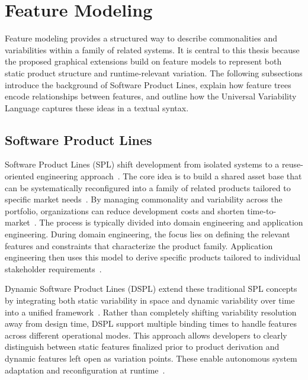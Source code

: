 \section{Feature Modeling}
\label{sec:bg_feature_modeling}

Feature modeling provides a structured way to describe commonalities and variabilities within a family of related systems.
It is central to this thesis because the proposed graphical extensions build on feature models to represent both static product structure and runtime-relevant variation.
The following subsections introduce the background of Software Product Lines, explain how feature trees encode relationships between features, and outline how the Universal Variability Language captures these ideas in a textual syntax.

\subsection{Software Product Lines}
\label{subsec:bg_feature_modeling_spl}

Software Product Lines (SPL) shift development from isolated systems to a reuse-oriented engineering approach~\cite{clements_software_2002}.
The core idea is to build a shared asset base that can be systematically reconfigured into a family of related products tailored to specific market needs~\cite{lee_concepts_2002}.
By managing commonality and variability across the portfolio, organizations can reduce development costs and shorten time-to-market~\cite{pohl_software_2005}.
The process is typically divided into domain engineering and application engineering.
During domain engineering, the focus lies on defining the relevant features and constraints that characterize the product family.
Application engineering then uses this model to derive specific products tailored to individual stakeholder requirements~\cite{buhne_modelling_2005, apel_overview_2009}.

Dynamic Software Product Lines (DSPL) extend these traditional SPL concepts by integrating both static variability in space and dynamic variability over time into a unified framework~\cite{burdek_staged_2014}.
Rather than completely shifting variability resolution away from design time, DSPL support multiple binding times to handle features across different operational modes.
This approach allows developers to clearly distinguish between static features finalized prior to product derivation and dynamic features left open as variation points.
These enable autonomous system adaptation and reconfiguration at runtime~\cite{capilla_overview_2014}.

